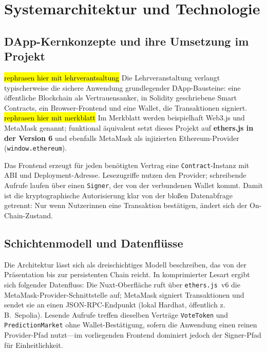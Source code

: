 \chapter{Systemarchitektur und Technologie}
\label{chap:arch}

\section{DApp-Kernkonzepte und ihre Umsetzung im Projekt}

\hl{rephrasen hier mit lehrverantsaltung}
Die Lehrveranstaltung verlangt typischerweise die sichere Anwendung
grundlegender DApp-Bausteine: eine öffentliche Blockchain als Vertrauensanker,
in Solidity geschriebene Smart Contracts, ein Browser-Frontend und eine Wallet,
die Transaktionen signiert. \hl{rephrasen hier mit merkblatt} Im Merkblatt werden beispielhaft Web3.js und MetaMask
genannt; funktional äquivalent setzt dieses Projekt auf \textbf{ethers.js in der
Version 6} und ebenfalls MetaMask als injizierten Ethereum-Provider
(\texttt{window.ethereum}).

Das Frontend erzeugt für jeden benötigten Vertrag eine \texttt{Contract}-Instanz
mit ABI und Deployment-Adresse. Lesezugriffe nutzen den Provider; schreibende
Aufrufe laufen über einen \texttt{Signer}, der von der verbundenen Wallet
kommt. Damit ist die kryptographische Autorisierung klar von der bloßen
Datenabfrage getrennt: Nur wenn Nutzerinnen eine Transaktion bestätigen, ändert
sich der On-Chain-Zustand.

\section{Schichtenmodell und Datenflüsse}

\begin{sloppypar}
Die Architektur lässt sich als dreischichtiges Modell beschreiben, das von der
Präsentation bis zur persistenten Chain reicht. In komprimierter Lesart ergibt
sich folgender Datenfluss: Die Nuxt-Oberfläche ruft über \texttt{ethers.js}~v6
die MetaMask-Provider-Schnittstelle auf; MetaMask signiert Transaktionen und
sendet sie an einen JSON-RPC-Endpunkt (lokal Hardhat, öffentlich z.\,B.\
Sepolia). Lesende Aufrufe treffen dieselben Verträge \texttt{VoteToken} und
\texttt{PredictionMarket} ohne Wallet-Bestätigung, sofern die Anwendung einen
reinen Provider-Pfad nutzt---im vorliegenden Frontend dominiert jedoch der
Signer-Pfad für Einheitlichkeit.
\end{sloppypar}

